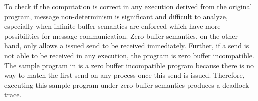 To check if the computation is correct in any execution derived from the original program, message non-determinism is significant and difficult to analyze, especially when infinite buffer semantics are enforced which have more possibilities for message communication. Zero buffer semantics, on the other hand, only allows a issued send to be received immediately. Further, if a send is not able to be received in any execution, the program is zero buffer incompatible. The sample program in  is a zero buffer incompatible program because there is no way to match the first send on any process once this send is issued. Therefore, executing this sample program under zero buffer semantics produces a deadlock trace. 



